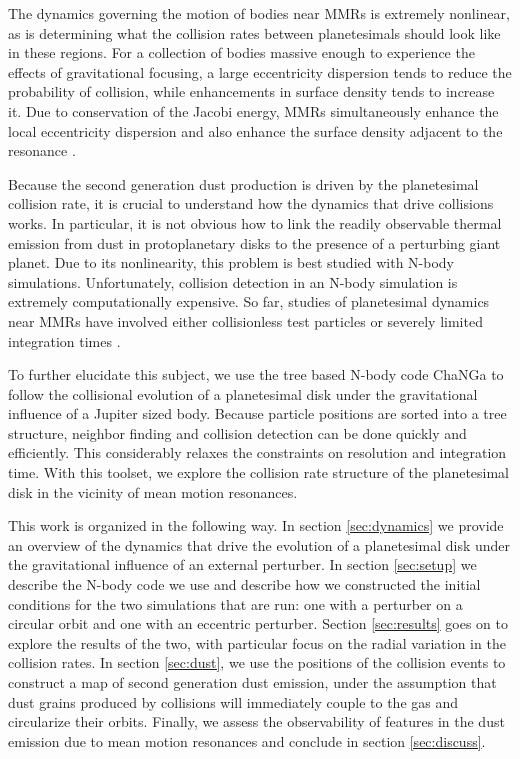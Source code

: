 \documentclass[twocolumn]{aastex63}
\begin{document}
The dynamics governing the motion of bodies near MMRs is extremely nonlinear, as is determining what the collision rates between planetesimals should look like in these regions. For a collection of bodies massive enough to experience the effects of gravitational focusing, a large eccentricity dispersion tends to reduce the probability of collision, while enhancements in surface density tends to increase it. Due to conservation of the Jacobi energy, MMRs simultaneously enhance the local eccentricity dispersion and also enhance the surface density adjacent to the resonance \citep{2000Icar..143...45R, 2017ApJ...850..103B}.

Because the second generation dust production is driven by the planetesimal collision rate, it is crucial to understand how the dynamics that drive collisions works. In particular, it is not obvious how to link the readily observable thermal emission from dust in protoplanetary disks to the presence of a perturbing giant planet. Due to its nonlinearity, this problem is best studied with N-body simulations. Unfortunately, collision detection in an N-body simulation is extremely computationally expensive. So far, studies of planetesimal dynamics near MMRs have involved either collisionless test particles \citep{2017ApJ...850..103B, 2016ApJ...818..159T, 2018ApJ...857....3T} or severely limited integration times \citep{2000Icar..143...45R}.

To further elucidate this subject, we use the tree based N-body code {\sc ChaNGa} \citep{2008IEEEpds...ChaNGa, 2015AphCom..2..1} to follow the collisional evolution of a planetesimal disk under the gravitational influence of a Jupiter sized body. Because particle positions are sorted into a tree structure, neighbor finding and collision detection can be done quickly and efficiently. This considerably relaxes the constraints on resolution and integration time. With this toolset, we explore the collision rate structure of the planetesimal disk in the vicinity of mean motion resonances.

This work is organized in the following way. In section \ref{sec:dynamics} we provide an overview of the dynamics that drive the evolution of a planetesimal disk under the gravitational influence of an external perturber. In section \ref{sec:setup} we describe the N-body code we use and describe how we constructed the initial conditions for the two simulations that are run: one with a perturber on a circular orbit and one with an eccentric perturber. Section \ref{sec:results} goes on to explore the results of the two, with particular focus on the radial variation in the collision rates. In section \ref{sec:dust}, we use the positions of the collision events to construct a map of second generation dust emission, under the assumption that dust grains produced by collisions will immediately couple to the gas and circularize their orbits. Finally, we assess the observability of features in the dust emission due to mean motion resonances and conclude in section \ref{sec:discuss}.
\end{document}
